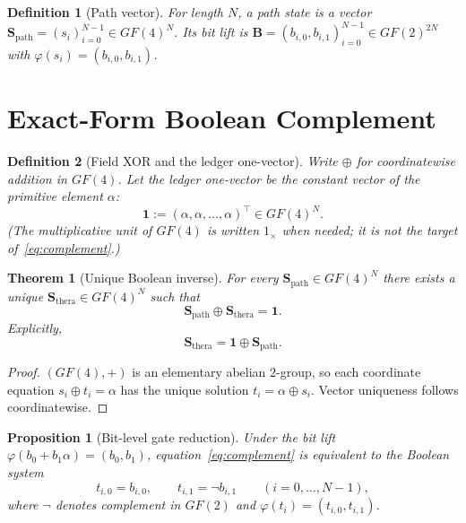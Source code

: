 \documentclass[11pt,a4paper]{article}
\newtheorem{definition}{Definition}
\newtheorem{proposition}{Proposition}
\newtheorem{theorem}{Theorem}
\begin{document}
\begin{definition}[Path vector]
For length \(N\), a path state is a vector
\(\mathbf{S}_{\mathrm{path}}=(s_i)_{i=0}^{N-1}\in GF(4)^N\).
Its bit lift is
\(\mathbf{B}=(b_{i,0},b_{i,1})_{i=0}^{N-1}\in GF(2)^{2N}\) with
\(\varphi(s_i)=(b_{i,0},b_{i,1})\).
\end{definition}

\section{Exact-Form Boolean Complement}

\begin{definition}[Field XOR and the ledger one-vector]
Write \(\oplus\) for coordinatewise addition in \(GF(4)\).
Let the \emph{ledger one-vector} be the constant vector of the primitive
element \(\alpha\):
\begin{equation}
  \mathbf{1}:=(\alpha,\alpha,\ldots,\alpha)^\top\in GF(4)^N.
\end{equation}
(The multiplicative unit of \(GF(4)\) is written \(1_{\times}\) when needed;
it is \emph{not} the target of~\eqref{eq:complement}.)
\end{definition}

\begin{theorem}[Unique Boolean inverse]
For every \(\mathbf{S}_{\mathrm{path}}\in GF(4)^N\) there exists a unique
\(\mathbf{S}_{\mathrm{thera}}\in GF(4)^N\) such that
\begin{equation}
  \label{eq:complement}
  \mathbf{S}_{\mathrm{path}}\oplus\mathbf{S}_{\mathrm{thera}}=\mathbf{1}.
\end{equation}
Explicitly,
\[
  \mathbf{S}_{\mathrm{thera}}=\mathbf{1}\oplus\mathbf{S}_{\mathrm{path}}.
\]
\end{theorem}

\begin{proof}
\((GF(4),+)\) is an elementary abelian \(2\)-group, so each coordinate
equation \(s_i\oplus t_i=\alpha\) has the unique solution
\(t_i=\alpha\oplus s_i\). Vector uniqueness follows coordinatewise.
\end{proof}

\begin{proposition}[Bit-level gate reduction]
Under the bit lift \(\varphi(b_0+b_1\alpha)=(b_0,b_1)\),
equation~\eqref{eq:complement} is equivalent to the Boolean system
\begin{equation}
  \label{eq:gates}
  t_{i,0}=b_{i,0},\qquad
  t_{i,1}=\neg b_{i,1}
  \qquad(i=0,\ldots,N-1),
\end{equation}
where \(\neg\) denotes complement in \(GF(2)\) and
\(\varphi(t_i)=(t_{i,0},t_{i,1})\).
\end{proposition}
\end{document}
